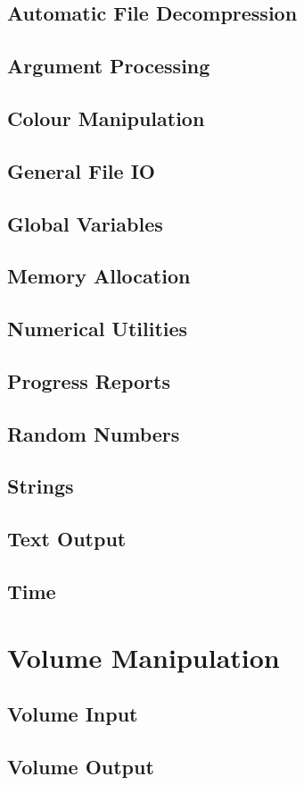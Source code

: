 \subsection{Automatic File Decompression}

\subsection{Argument Processing}

\subsection{Colour Manipulation}

\subsection{General File IO}

\subsection{Global Variables}

\subsection{Memory Allocation}

\subsection{Numerical Utilities}

\subsection{Progress Reports}

\subsection{Random Numbers}

\subsection{Strings}

\subsection{Text Output}

\subsection{Time}

\section{Volume Manipulation}

\subsection{Volume Input}

\subsection{Volume Output}


